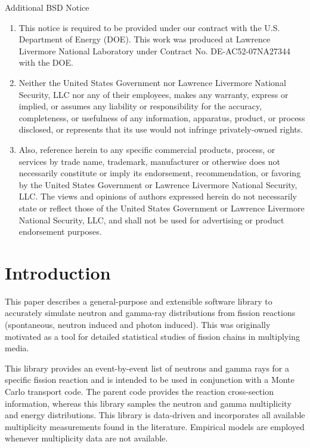\documentclass[fleqn,11pt]{article}
\begin{document}
Additional BSD Notice

\begin{enumerate}
\item This notice is required to be provided under our contract with the U.S. Department of Energy (DOE). This work was produced at Lawrence Livermore National Laboratory under Contract No. DE-AC52-07NA27344 with the DOE. 

\item  Neither the United States Government nor Lawrence Livermore National Security, LLC nor any of their employees, makes any warranty, express or implied, or assumes any liability or responsibility for the accuracy, completeness, or usefulness of any information, apparatus, product, or process disclosed, or represents that its use would not infringe privately-owned rights. 

\item Also, reference herein to any specific commercial products, process, or services by trade name, trademark, manufacturer or otherwise does not necessarily constitute or imply its endorsement, recommendation, or favoring by the United States Government or Lawrence Livermore National Security, LLC. The views and opinions of authors expressed herein do not necessarily state or reflect those of the United States Government or Lawrence Livermore National Security, LLC, and shall not be used for advertising or product endorsement purposes.
\end{enumerate}

\section{Introduction}

This paper describes a general-purpose and extensible software library
to accurately simulate neutron and gamma-ray distributions from fission
reactions (spontaneous, neutron induced and photon induced).  This was
originally motivated as a tool for detailed statistical studies of fission chains in multiplying
media. 

This library provides an event-by-event list of neutrons and gamma rays for a specific
fission reaction and is intended to be used in conjunction with a Monte Carlo transport code.
The parent code provides the reaction cross-section information, whereas this library samples
the neutron and gamma multiplicity and energy distributions. This library is data-driven 
and incorporates all available
multiplicity measurements found in the literature. Empirical models
are employed whenever multiplicity data are not available.
\end{document}
